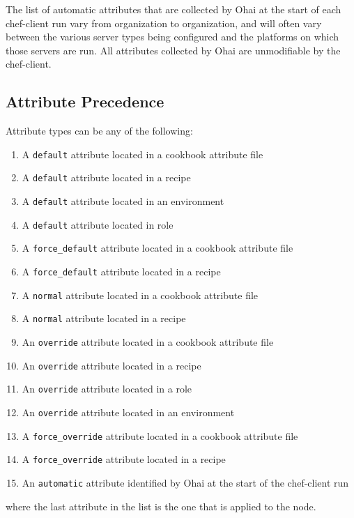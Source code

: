 The list of automatic attributes that are collected by Ohai at the start of each chef-client run vary from organization to organization, and will often vary between the various server types being configured and the platforms on which those servers are run. All attributes collected by Ohai are unmodifiable by the chef-client.

\subsection{Attribute Precedence}

Attribute types can be any of the following:

\begin{enumerate}
  \item A \lstinline!default! attribute located in a cookbook attribute file
  \item A \lstinline!default! attribute located in a recipe
  \item A \lstinline!default! attribute located in an environment
  \item A \lstinline!default! attribute located in role
  \item A \lstinline!force_default! attribute located in a cookbook attribute file
  \item A \lstinline!force_default! attribute located in a recipe
  \item A \lstinline!normal! attribute located in a cookbook attribute file
  \item A \lstinline!normal! attribute located in a recipe
  \item An \lstinline!override! attribute located in a cookbook attribute file
  \item An \lstinline!override! attribute located in a recipe
  \item An \lstinline!override! attribute located in a role
  \item An \lstinline!override! attribute located in an environment
  \item A \lstinline!force_override! attribute located in a cookbook attribute file
  \item A \lstinline!force_override! attribute located in a recipe
  \item An \lstinline!automatic! attribute identified by Ohai at the start of the chef-client run
\end{enumerate}

where the last attribute in the list is the one that is applied to the node.

